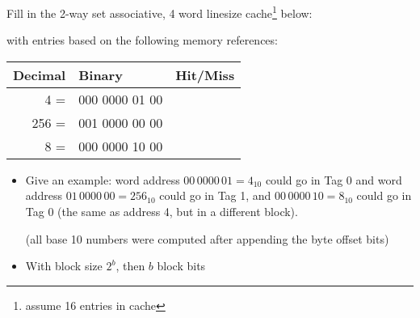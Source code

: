 \begin{frame}[fragile]

  \begin{tcolorbox}[enhanced,attach boxed title to top center={yshift=-3mm,yshifttext=-1mm},
  colback=blue!5!white,colframe=blue!75!black,colbacktitle=blue!80!black,
  title=Think About It,fonttitle=\bfseries,
  boxed title style={size=small,colframe=red!50!black} ]
Fill in the 2-way set associative, 4 word linesize cache{\footnote{assume 16 entries in cache}} below:

with entries based on the following memory references:

\begin{tabular}{rlc}\\
            Decimal & Binary & Hit/Miss\\\hline
          4 = &000 0000 01 00&\\
          256 = &001 0000 00 00&\\
          8 = & 000 0000 10 00&\\
          \hline
          \end{tabular}

  \end{tcolorbox}

\BNotes\ifnum{}
\begin{itemize}
\item Give an example: word address $00\,0000\,01=4_{10}$ could go in Tag 0 and
	word address $01\,0000\,00=256_{10}$ could go in Tag 1, and 
	$00\,0000\,10=8_{10}$ could go in Tag 0 (the same as 
	address 4, but in a different block).

	(all base 10 numbers were computed after appending the byte offset bits)
\item With block size $2^b$, then $b$ block bits
\end{itemize}
\fi\ENotes
\end{frame}

